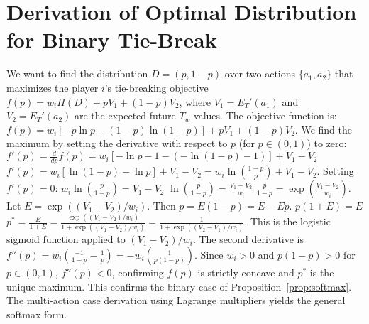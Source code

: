 \documentclass{article}
\begin{document}
\section{Derivation of Optimal Distribution for Binary Tie-Break} \label{app:softmax_proof}
We want to find the distribution $D = (p, 1-p)$ over two actions $\{a_1, a_2\}$ that maximizes the player $i$'s tie-breaking objective $f(p) = w_i H(D) + p V_1 + (1-p) V_2$, where $V_1 = E_T'(a_1)$ and $V_2 = E_T'(a_2)$ are the expected future $T_w$ values.
The objective function is:
$f(p) = w_i [-p \ln p - (1-p) \ln(1-p)] + p V_1 + (1-p) V_2$.
We find the maximum by setting the derivative with respect to $p$ (for $p \in (0, 1)$) to zero:
$f'(p) = \frac{d}{dp} f(p) = w_i [-\ln p - 1 - (-\ln(1-p) - 1)] + V_1 - V_2$
$f'(p) = w_i [ \ln(1-p) - \ln p ] + V_1 - V_2 = w_i \ln\left(\frac{1-p}{p}\right) + V_1 - V_2$.
Setting $f'(p) = 0$:
$w_i \ln\left(\frac{p}{1-p}\right) = V_1 - V_2$
$\ln\left(\frac{p}{1-p}\right) = \frac{V_1 - V_2}{w_i}$
$\frac{p}{1-p} = \exp\left(\frac{V_1 - V_2}{w_i}\right)$.
Let $E = \exp((V_1 - V_2) / w_i)$. Then $p = E(1-p) = E - Ep$.
$p(1+E) = E$
$p^* = \frac{E}{1+E} = \frac{\exp((V_1 - V_2) / w_i)}{1 + \exp((V_1 - V_2) / w_i)} = \frac{1}{1 + \exp((V_2 - V_1) / w_i)}$.
This is the logistic sigmoid function applied to $(V_1 - V_2) / w_i$.
The second derivative is $f''(p) = w_i \left( \frac{-1}{1-p} - \frac{1}{p} \right) = -w_i \left( \frac{1}{p(1-p)} \right)$. Since $w_i > 0$ and $p(1-p) > 0$ for $p \in (0, 1)$, $f''(p) < 0$, confirming $f(p)$ is strictly concave and $p^*$ is the unique maximum.
This confirms the binary case of Proposition~\ref{prop:softmax}. The multi-action case derivation using Lagrange multipliers yields the general softmax form.

\end{document}
